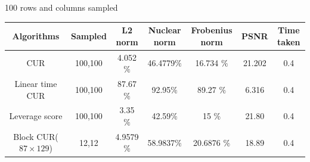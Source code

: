 \documentclass{article}
\begin{document}
\begin{figure}[ht]
 \centering    
\end{figure}

\begin{figure}[ht]
 \centering    
\end{figure}

\begin{figure}[ht]
 \centering    
\end{figure}



100 rows and columns sampled

\begin{tabular}{|c|c|c|c|c|c|c|} \hline
     Algorithms & Sampled & L2 norm & Nuclear norm& Frobenius norm & PSNR & Time taken\\ \hline
     CUR & 100,100 & 4.052 $\%$ & 46.4779$\%$ & 16.734 $\%$ & 21.202 & 0.4\\ \hline
     Linear time CUR & 100,100 & 87.67 $\%$ & 92.95$\%$ & 89.27 $\%$ & 6.316 & 0.4 \\ \hline
     Leverage score & 100,100& 3.35 $\%$ & 42.59$\%$ & 15 $\%$ & 21.80 & 0.4\\ \hline
     Block CUR($87 \times 129$) & 12,12 & 4.9579 $\%$ & 58.9837$\%$ & 20.6876 $\%$& 18.89 & 0.4\\ \hline
\end{tabular}
\end{document}
